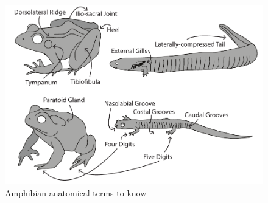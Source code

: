 \documentclass[a4paper,12pt]{article}
\begin{document}
\begin{figure}[h]
\centering
  \includegraphics{AmphibianAnatomy.pdf}
  \caption{Amphibian anatomical terms to know}
  \label{fig:Anura}
\end{figure}
\end{document}
